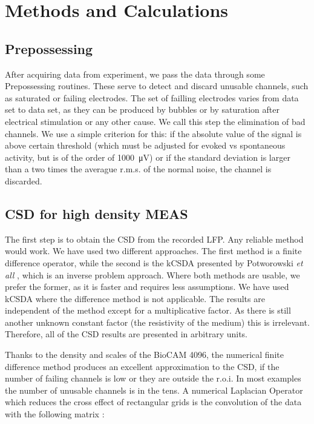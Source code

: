 \documentclass[11pt, letterpaper]{article}
\newcommand{\muV}[1]{\SI{#1}{\micro\volt}}
\begin{document}
\section{Methods and Calculations}

\subsection{Prepossessing}

After acquiring data from experiment, we pass the data through some Prepossessing
routines. These serve to detect and discard unusable channels,
such as saturated or failing electrodes. The
set of failling electrodes varies from data set to data set,
as they can be produced by bubbles or by saturation after electrical stimulation
or any other cause. 
We call this step the elimination of bad channels. We use a simple criterion for this:
if the absolute value of the signal is above certain threshold (which must be
adjusted for evoked vs spontaneous activity, but
is of the order of \muV{1000}) or if the standard deviation is
larger than a two times the averague r.m.s.  of the normal noise,
the channel is discarded.


\subsection{CSD for high density MEAS}

The first step is to obtain the CSD from the recorded LFP.
Any reliable method would work.
We have used two different
approaches. The first method is a  finite difference operator,
while the second is the kCSDA presented by
Potworowski \emph{et all} \cite{Potworowski2011},
which is an inverse problem approach.
Where both methods are usable, we prefer the former,
as it is faster and requires less assumptions.
We have used kCSDA where
the difference method is not applicable. The results are
independent of the method except for a multiplicative factor.
As there is still another unknown constant factor
(the resistivity of the medium) this is irrelevant.
Therefore, all of the CSD results are presented in arbitrary units.

Thanks to the density and scales of the BioCAM 4096,
the numerical finite difference method
produces an excellent approximation to the CSD,
if the number of failing channels is low or
they are outside the r.o.i.
In most examples the number  of unusable channels is in the tens.
A  numerical Laplacian Operator which reduces the cross effect of
rectangular grids is the convolution of the data with the following
matrix \cite{Lindberg90}:
\end{document}
